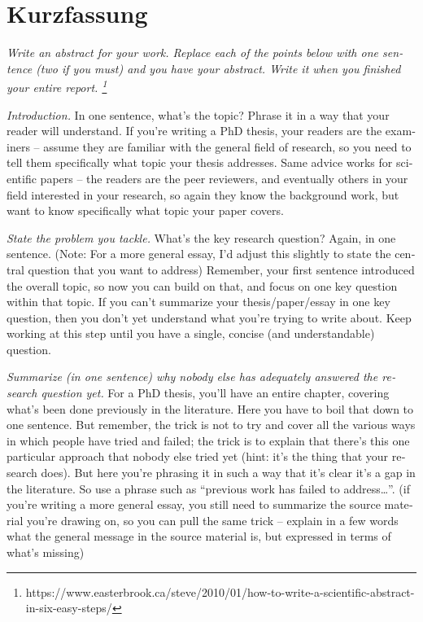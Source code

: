 \documentclass[
  numbers=autoendperiod,
  ngerman,  %
  a4paper,  %
  twoside,  %
  bibliography=totoc,
  headsepline,
  cleardoublepage=empty,
  parskip=half,
  draft=false
]{scrbook}
\theoremstyle{break}
\begin{document}
\raggedbottom     %
\ifluatex
\fi

\Titelblatt

\pagestyle{plain.scrheadings}
\renewcommand*{\chapterpagestyle}{plain.scrheadings}

\section*{Kurzfassung}
\begin{otherlanguage}{american}
  \emph{Write an abstract for your work.
    Replace each of the points below with one sentence (two if you must) and you have your abstract.
    Write it when you finished your entire report.
    \footnote{https://www.easterbrook.ca/steve/2010/01/how-to-write-a-scientific-abstract-in-six-easy-steps/}}

  \emph{Introduction.}
  In one sentence, what’s the topic?
  Phrase it in a way that your reader will understand.
  If you’re writing a PhD thesis, your readers are the examiners – assume they are familiar with the general field of research, so you need to tell them specifically what topic your thesis addresses.
  Same advice works for scientific papers – the readers are the peer reviewers, and eventually others in your field interested in your research, so again they know the background work, but want to know specifically what topic your paper covers.

  \emph{State the problem you tackle.}
  What’s the key research question?
  Again, in one sentence.
  (Note: For a more general essay, I’d adjust this slightly to state the central question that you want to address)
  Remember, your first sentence introduced the overall topic, so now you can build on that, and focus on one key question within that topic.
  If you can’t summarize your thesis/paper/essay in one key question, then you don’t yet understand what you’re trying to write about.
  Keep working at this step until you have a single, concise (and understandable) question.

  \emph{Summarize (in one sentence) why nobody else has adequately answered the research question yet.}
  For a PhD thesis, you’ll have an entire chapter, covering what’s been done previously in the literature.
  Here you have to boil that down to one sentence.
  But remember, the trick is not to try and cover all the various ways in which people have tried and failed; the trick is to explain that there’s this one particular approach that nobody else tried yet (hint: it’s the thing that your research does).
  But here you’re phrasing it in such a way that it’s clear it’s a gap in the literature.
  So use a phrase such as “previous work has failed to address…”.
  (if you’re writing a more general essay, you still need to summarize the source material you’re drawing on, so you can pull the same trick – explain in a few words what the general message in the source material is, but expressed in terms of what’s missing)


\end{otherlanguage}
\end{document}
